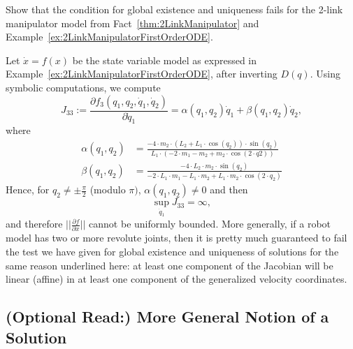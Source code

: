 \bigskip

\begin{example} Show that the condition for global existence and uniqueness fails for the 2-link manipulator model from Fact~\ref{thm:2LinkManipulator} and Example~\ref{ex:2LinkManipulatorFirstOrderODE}.    
\end{example}
\solution 
Let $\dot{x}=f(x)$ be the state variable model as expressed in Example~\ref{ex:2LinkManipulatorFirstOrderODE}, after inverting $D(q)$. Using symbolic computations, we compute
$$J_{33}:=\frac{\partial f_3(q_1, q_2, \dot{q}_1, \dot{q}_2)}{\partial \dot{q}_1} = \alpha(q_1, q_2) \dot{q}_1 + \beta(q_1, q_2) \dot{q}_2,$$
where
\begin{align*}
\alpha(q_1, q_2) & =  \frac{-4 \cdot m_2 \cdot (L_2 + L_1 \cdot \cos(q_2)) \cdot \sin(q_2)}{L_1 \cdot (-2 \cdot m_1 - m_2 + m_2 \cdot \cos(2 \cdot q2))} \\[1em]
%
\beta(q_1, q_2) & = 
    \frac{-4 \cdot L_2 \cdot m_2 \cdot \sin(q_2)}{-2 \cdot L_1 \cdot m_1 - L_1 \cdot m_2 + L_1 \cdot m_2 \cdot \cos(2 \cdot q_2)}
\end{align*}
Hence, for $q_2 \neq \pm \frac{\pi}{2}$ (modulo $\pi)$, $\alpha(q_1, q_2) \neq 0$ and then 
$$ \sup_{\dot{q}_1} J_{33} = \infty,$$
and therefore $||\frac{\partial f}{\partial x}||$ cannot be uniformly bounded. More generally, if a robot model has two or more revolute joints, then it is pretty much guaranteed to fail the test we have given for global existence and uniqueness of solutions for the same reason underlined here: at least one component of the Jacobian will be linear (affine) in at least one component of the generalized velocity coordinates. 
\Qed


\subsection{(Optional Read:) More General Notion of a Solution}
\label{sec:MoreGeneralSolutionODE}

